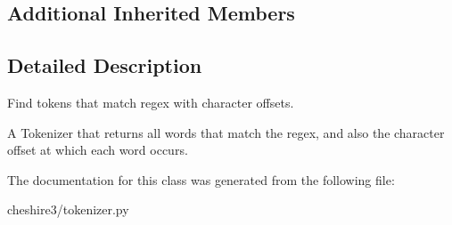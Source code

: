 \subsection*{Additional Inherited Members}


\subsection{Detailed Description}
\begin{DoxyVerb}Find tokens that match regex with character offsets.

A Tokenizer that returns all words that match the regex, and also the 
character offset at which each word occurs.
\end{DoxyVerb}
 

The documentation for this class was generated from the following file\-:\begin{DoxyCompactItemize}
\item 
cheshire3/tokenizer.\-py\end{DoxyCompactItemize}
